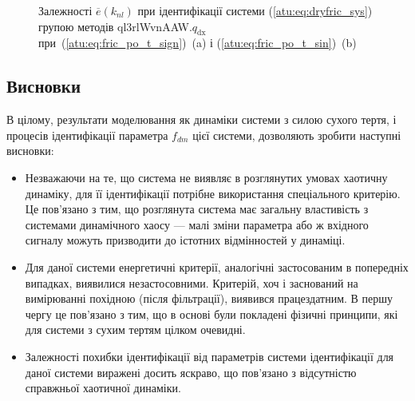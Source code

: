 \begin{figure}[htb!]
  \caption{Залежності $\overline{e}(k_{nl})$ при ідентифікації системи (\ref{atu:eq:dryfric_sys}) групою методів ql3rlWvnAAW.$q_\mathrm{dx} $ при~(\ref{atu:eq:fric_po_t_sign})~(a) і (\ref{atu:eq:fric_po_t_sin})~(b)}
\label{atu:f:fric_k_nl_ql3rlWvnAAW_q_dx}
\end{figure}



\subsection{Висновки}%

В цілому, результати моделювання як динаміки системи з силою
сухого тертя, і процесів ідентифікації параметра
$ f_{dm} $ цієї системи, дозволяють зробити наступні висновки:

\begin{itemize}

  \item
    Незважаючи на те, що система не виявляє в розглянутих умовах
    хаотичну динаміку, для її ідентифікації потрібне використання
    спеціального критерію. Це пов'язано з тим, що розглянута система
    має загальну властивість з системами динамічного хаосу --- малі
    зміни параметра або ж вхідного сигналу можуть призводити до
    істотних відмінностей у динаміці.

  \item
    Для даної системи енергетичні критерії, аналогічні застосованим
    в попередніх випадках, виявилися незастосовними. Критерій, хоч і
    заснований на вимірюванні похідною (після фільтрації), виявився
    працездатним. В першу чергу це пов'язано з тим, що в основі були
    покладені фізичні принципи, які для системи з сухим тертям цілком очевидні.

  \item
    Залежності похибки ідентифікації від параметрів системи
    ідентифікації для даної системи виражені досить яскраво, що
    пов'язано з відсутністю справжньої хаотичної динаміки.

\end{itemize}







